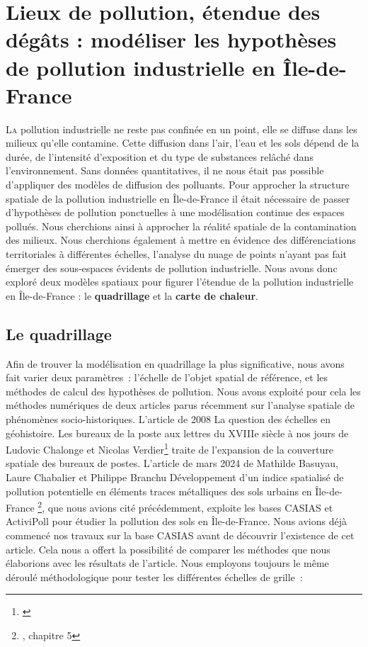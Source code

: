 \documentclass[a4paper,twoside,12pt]{book}
\begin{document}
\chapter{Lieux de pollution, étendue des dégâts : modéliser les hypothèses de pollution industrielle en Île-de-France}

\lettrine{L}{a} pollution industrielle ne reste pas confinée en un point, elle se diffuse dans les milieux qu'elle contamine. Cette diffusion dans l'air, l'eau et les sols dépend de la durée, de l'intensité d'exposition et du type de substances relâché dans l'environnement. Sans données quantitatives, il ne nous était pas possible d'appliquer des modèles de diffusion des polluants. Pour approcher la structure spatiale de la pollution industrielle en Île-de-France il était nécessaire de passer d'hypothèses de pollution ponctuelles à une modélisation continue des espaces pollués. Nous cherchions ainsi à approcher la réalité spatiale de la contamination des milieux. Nous cherchions également à mettre en évidence des différenciations territoriales à différentes échelles, l'analyse du nuage de points n'ayant pas fait émerger des sous-espaces évidents de pollution industrielle. Nous avons donc exploré deux modèles spatiaux pour figurer l'étendue de la pollution industrielle en Île-de-France : le \textbf{quadrillage} et la \textbf{carte de chaleur}. 


\section{Le quadrillage}

Afin de trouver la modélisation en quadrillage la plus significative, nous avons fait varier deux paramètres : l’échelle de l’objet spatial de référence, et les méthodes de calcul des hypothèses de pollution. Nous avons exploité pour cela les méthodes numériques de deux articles parus récemment sur l'analyse spatiale de phénomènes socio-historiques. L'article de 2008 \og{} La question des échelles en géohistoire. Les bureaux de la poste aux lettres du XVIIIe siècle à nos jours \fg{} de Ludovic Chalonge et Nicolas Verdier\footnote{\cite{verdier_question_2018}} traite de l'expansion de la couverture spatiale des bureaux de postes. L'article de mars 2024 de Mathilde Basuyau, Laure Chabalier et Philippe Branchu \og{} Développement d'un indice spatialisé de pollution potentielle en éléments traces métalliques des sols urbains en Île-de-France \fg{}\footnote{\cite{charvet_sols_2024}, chapitre 5}, que nous avions cité précédemment, exploite les bases CASIAS et ActiviPoll pour étudier la pollution des sols en Île-de-France. Nous avions déjà commencé nos travaux sur la base CASIAS avant de découvrir l'existence de cet article. Cela nous a offert la possibilité de comparer les méthodes que nous élaborions avec les résultats de l'article. Nous employons toujours le même déroulé méthodologique pour tester les différentes échelles de grille : 
\end{document}
